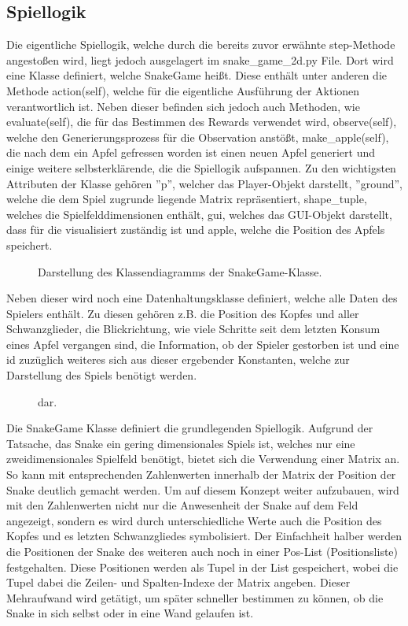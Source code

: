 \subsection{Spiellogik} \label{sec:Impl_Spiellogik}
Die eigentliche Spiellogik, welche durch die bereits zuvor erwähnte step-Methode angestoßen wird, liegt jedoch ausgelagert im snake\_game\_2d.py File. Dort wird eine Klasse definiert, welche SnakeGame heißt. Diese enthält unter anderen die Methode action(self), welche für die eigentliche Ausführung der Aktionen verantwortlich ist. 
Neben dieser befinden sich jedoch auch Methoden, wie evaluate(self), die für das Bestimmen des Rewards verwendet wird, observe(self), welche den Generierungsprozess für die Observation anstößt, make\_apple(self), die nach dem ein Apfel gefressen worden ist einen neuen Apfel generiert und einige weitere selbsterklärende, die die Spiellogik aufspannen. Zu den wichtigsten Attributen der Klasse gehören ''p'', welcher das Player-Objekt darstellt, ''ground'', welche die dem Spiel zugrunde liegende Matrix repräsentiert, shape\_tuple, welches die Spielfelddimensionen enthält, gui, welches das GUI-Objekt darstellt, dass für die visualisiert zuständig ist und apple, welche die Position des Apfels speichert.
\begin{figure}[H]
	\centering
	\def\svgscale{0.90}
	
	\caption[Klassendiagramm: snake\_game\_2d]{Darstellung des Klassendiagramms der SnakeGame-Klasse.}
	\label{fig:SnakeGame_class_diagram}
\end{figure}
Neben dieser wird noch eine Datenhaltungsklasse definiert, welche alle Daten des Spielers enthält. Zu diesen gehören z.B. die Position des Kopfes und aller Schwanzglieder, die Blickrichtung, wie viele Schritte seit dem letzten Konsum eines Apfel vergangen sind, die Information, ob der Spieler gestorben ist und eine id zuzüglich weiteres sich aus dieser ergebender Konstanten, welche zur Darstellung des Spiels benötigt werden.
\begin{figure}[H]
	\centering
	\def\svgscale{1.02}
	
	\caption[Klassendiagramm: Player-Datenhaltungsklasse]{dar.}
	\label{fig:class_diagram}
\end{figure}
Die SnakeGame Klasse definiert die grundlegenden Spiellogik. Aufgrund der Tatsache, das Snake ein gering dimensionales Spiels ist, welches nur eine zweidimensionales Spielfeld benötigt, bietet sich die Verwendung einer Matrix an. So kann mit entsprechenden Zahlenwerten innerhalb der Matrix der Position der Snake deutlich gemacht werden. Um auf diesem Konzept weiter aufzubauen, wird mit den Zahlenwerten nicht nur die Anwesenheit der Snake auf dem Feld angezeigt, sondern es wird durch unterschiedliche Werte auch die Position des Kopfes und es letzten Schwanzgliedes symbolisiert. Der Einfachheit halber werden die Positionen der Snake des weiteren auch noch in einer Pos-List (Positionsliste) festgehalten. Diese Positionen werden als Tupel in der List gespeichert, wobei die Tupel dabei die Zeilen- und Spalten-Indexe der Matrix angeben. Dieser Mehraufwand wird getätigt, um später schneller bestimmen zu können, ob die Snake in sich selbst oder in eine Wand gelaufen ist.\\
